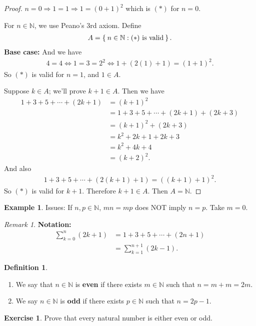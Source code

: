 \documentclass[12pt]{amsbook}
\theoremstyle{plain}
\numberwithin{section}{chapter}
\numberwithin{equation}{chapter}
\theoremstyle{definition}
\newtheorem{e}{Exercise}
\newtheorem{Def}[theorem]{Definition}
\newtheorem{Ex}[theorem]{Example}
\theoremstyle{remark}
\newtheorem{rem}[theorem]{Remark}
\theoremstyle{plain}
\newcommand{\n}{\mathbb{N}}
\newcommand{\bee}{\begin{equation}\begin{aligned}}
\newcommand{\eee}{\end{aligned}\end{equation}}
\begin{document}
\begin{proof}
$n = 0 \Rightarrow 1 = 1 \Rightarrow 1 = (0 + 1)^2$ which is $(*)$ for $n = 0$. 

For $n \in \n$, we use Peano's 3rd axiom. Define
\bee
A = \Set{n \in \n: (*)\text{ is valid}}.
\eee
\textbf{Base case:} And we have
\bee
4 = 4 \Leftrightarrow 1 = 3 = 2^2 \Leftrightarrow 1                                                                                               + (2(1) + 1) = (1 + 1)^2. 
\eee
So $(*)$ is valid for $n = 1$, and $1 \in A$. 

Suppose $k \in A$; we'll prove $k + 1 \in A$. Then we have
\bee
1 + 3 + 5 + \cdots + (2k + 1) &= (k + 1)^2\\
&=1 + 3 + 5 + \cdots + (2k + 1) + (2k + 3)\\
&= (k + 1)^2 + (2k + 3)\\
&= k^2 + 2k + 1 + 2k + 3\\
&= k^2 + 4k + 4\\
&= (k + 2)^2. 
\eee
And also
\bee
1 + 3 + 5 + \cdots + (2(k + 1) + 1) = ((k + 1) + 1)^2. 
\eee
So $(*)$ is valid for $k + 1$. Therefore $k + 1 \in A$. Then $A = \n$. 
\end{proof}

\begin{Ex}
Issues: If $n,p \in \n$, $mn = mp$ does NOT imply $n = p$. Take $m = 0$. 
\end{Ex}

\begin{rem}
\textbf{Notation: }
\bee
\sum_{k = 0}^n (2k + 1) &= 1 + 3 + 5 + \cdots + (2n + 1)\\
&= \sum_{k = 1}^{n + 1} (2k - 1).
\eee
\end{rem}



\begin{Def}
\begin{enumerate}
\item We say that $n \in \n$ is \textbf{even} if there exists $m \in \n$ such that $n = m + m = 2m$. 
\item We say $n \in \n$ is \textbf{odd} if there exists $p \in \n$ such that $n = 2p - 1$. 
\end{enumerate}
\end{Def}

\begin{e}
Prove that every natural number is either even or odd. 
\end{e}
\end{document}

